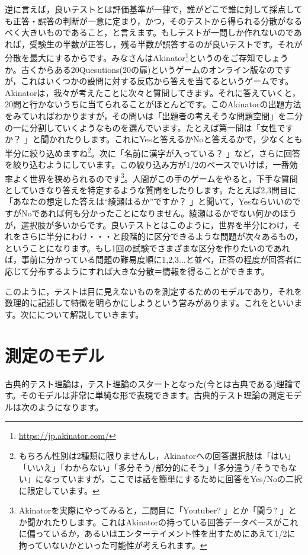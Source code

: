 \documentclass{ltjbook}
\begin{document}
逆に言えば，良いテストとは評価基準が一律で，誰がどこで誰に対して採点しても正答・誤答の判断が一意に定まり，かつ，そのテストから得られる分散がなるべく大きいものであること，と言えます。もしテストが一問しか作れないのであれば，受験生の半数が正答し，残る半数が誤答するのが良いテストです。それが分散を最大にするからです。みなさんはAkinator\footnote{\url{https://jp.akinator.com/}}というのをご存知でしょうか。古くからある20Quesutions(20の扉)というゲームのオンライン版なのですが，これはいくつかの設問に対する反応から答えを当てるというゲームです。Akinatorは，我々が考えたことに次々と質問してきます。それに答えていくと，20問と行かないうちに当てられることがほとんどです。このAkinatorの出題方法をみていればわかりますが，その問いは「出題者の考えそうな問題空間」を二分の一に分割していくようなものを選んでいます。たとえば第一問は「女性ですか？ 」と聞かれたりします。これにYesと答えるかNoと答えるかで，少なくとも半分に絞り込めますね\footnote{もちろん性別は2種類に限りませんし，Akinatorへの回答選択肢は「はい」「いいえ」「わからない」「多分そう/部分的にそう」「多分違う/そうでもない」になっていますが，ここでは話を簡単にするために回答をYes/Noの二択に限定しています。}。次に「名前に漢字が入っている？ 」など，さらに回答を絞り込むようにしています。この絞り込み方が1/2のペースでいけば，一番効率よく世界を狭められるのです\footnote{Akinatorを実際にやってみると，二問目に「Youtuber? 」とか「闘う? 」とか聞かれたりします。これはAkinatorの持っている回答データベースがこれに偏っているか，あるいはエンターテイメント性を出すためにあえて1/2に拘っていないかといった可能性が考えられます。}。人間がこの手のゲームをやると，下手な質問としていきなり答えを特定するような質問をしたりします。たとえば2,3問目に「あなたの想定した答えは``綾瀬はるか''ですか？ 」と聞いて，YesならいいのですがNoであれば何も分かったことになりません。綾瀬はるかでない何かのほうが，選択肢が多いからです。良いテストとはこのように，世界を半分にわけ，それをさらに半分にわけ・・・と段階的に区分できるような問題が次々あるもの，ということになります。もし1回の試験でさまざまな区分を作りたいのであれば，事前に分かっている問題の難易度順に1,2,3...と並べ，正答の程度が回答者に応じて分布するようにすれば大きな分散＝情報を得ることができます。

このように，テストは目に見えないものを測定するためのモデルであり，それを数理的に記述して特徴を明らかにしようという営みがあります。これをといいます。次にについて解説していきます。

\section{測定のモデル}
古典的テスト理論は，テスト理論のスタートとなった(今とは古典である)理論です。そのモデルは非常に単純な形で表現できます。古典的テスト理論の測定モデルは次のようになります。
\end{document}
